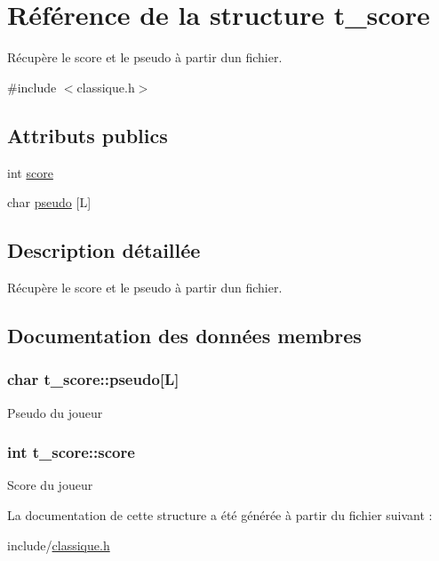 \hypertarget{structt__score}{}\section{Référence de la structure t\+\_\+score}
\label{structt__score}


Récupère le score et le pseudo à partir d\textquotesingle{}un fichier.  




{\ttfamily \#include $<$classique.\+h$>$}

\subsection*{Attributs publics}
\begin{DoxyCompactItemize}
\item 
int \hyperlink{structt__score_a342cf1aaec29772e5e56d29837395434}{score}
\item 
char \hyperlink{structt__score_afb0c7de99354ee59fd389d50e9a921b3}{pseudo} \mbox{[}L\mbox{]}
\end{DoxyCompactItemize}


\subsection{Description détaillée}
Récupère le score et le pseudo à partir d\textquotesingle{}un fichier. 

\subsection{Documentation des données membres}
\subsubsection[{\texorpdfstring{pseudo}{pseudo}}]{\setlength{\rightskip}{0pt plus 5cm}char t\+\_\+score\+::pseudo\mbox{[}L\mbox{]}}\hypertarget{structt__score_afb0c7de99354ee59fd389d50e9a921b3}{}\label{structt__score_afb0c7de99354ee59fd389d50e9a921b3}
Pseudo du joueur 
\subsubsection[{\texorpdfstring{score}{score}}]{\setlength{\rightskip}{0pt plus 5cm}int t\+\_\+score\+::score}\hypertarget{structt__score_a342cf1aaec29772e5e56d29837395434}{}\label{structt__score_a342cf1aaec29772e5e56d29837395434}
Score du joueur 

La documentation de cette structure a été générée à partir du fichier suivant \+:\begin{DoxyCompactItemize}
\item 
include/\hyperlink{classique_8h}{classique.\+h}\end{DoxyCompactItemize}
